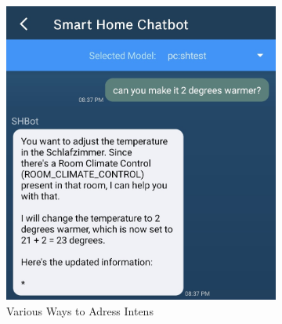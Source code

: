 \begin{figure}[htbp]
\begin{subfigure}{.48\textwidth}
        \includegraphics[width=\textwidth]{graphics/variousways.jpg}
        \caption{Various Ways to Adress Intens}
        \label{fig:variousways}
    \end{subfigure}
    \hfill
    \begin{subfigure}{.4\textwidth}

\end{subfigure}
\end{figure}
